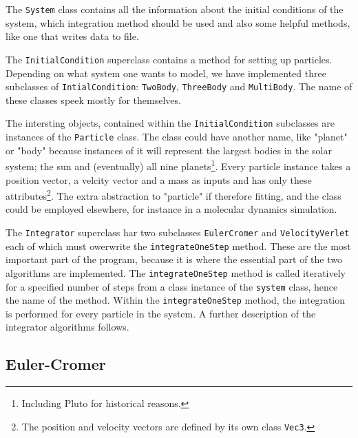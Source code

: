 \documentclass[10pt,a4paper]{amsart}
\begin{document}
The \lstinline|System| class contains all the information about the initial conditions of the system, which integration method should be used and also some helpful methods, like one that writes data to file.

The \lstinline|InitialCondition| superclass contains a method for setting up particles. Depending on what system one wants to model, we have implemented three subclasses of \lstinline|IntialCondition|: \lstinline|TwoBody|, \lstinline|ThreeBody| and \lstinline|MultiBody|. The name of these classes speek mostly for themselves.

The intersting objects, contained within the \lstinline|InitialCondition| subclasses are instances of the \lstinline|Particle| class. The class could have another name, like "planet" or "body" because instances of it will represent the largest bodies in the solar system; the sun and (eventually) all nine planets\footnote{Including Pluto for historical reasons.}. Every particle instance takes a position vector, a velcity vector and a mass as inputs and has only these attributes\footnote{The position and velocity vectors are defined by its own class \lstinline|Vec3|.}. The extra abstraction to "particle" if therefore fitting, and the class could be employed elsewhere, for instance in a molecular dynamics simulation.

The \lstinline|Integrator| superclass har two subclasses \lstinline|EulerCromer| and \lstinline|VelocityVerlet| each of which must owerwrite the \lstinline|integrateOneStep| method. These are the most important part of the program, because it is where the essential part of the two algorithms are implemented. The \lstinline|integrateOneStep| method is called iteratively for a specified number of steps from a class instance of the \lstinline|system| class, hence the name of the method. Within the \lstinline|integrateOneStep| method, the integration is performed for every particle in the system. A further description of the integrator algorithms follows.

\subsection{Euler-Cromer}
\end{document}
